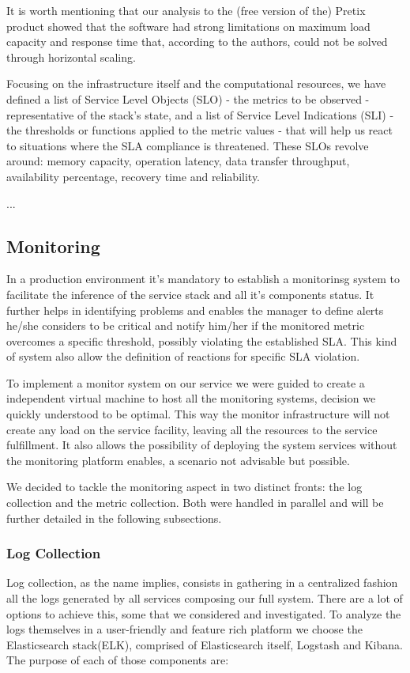 \documentclass[12pt]{article}
\begin{document}
It is worth mentioning that our analysis to the (free version of the) Pretix product showed that the software had strong limitations on maximum load capacity
and response time that, according to the authors, could not be solved through horizontal scaling.

Focusing on the infrastructure itself and the computational resources, we have defined a list of Service Level Objects (SLO) - the metrics to be observed -
representative of the stack's state, and a list of Service Level Indications (SLI) - the thresholds or functions applied to the metric values - that will
help us react to situations where the SLA compliance is threatened.
These SLOs revolve around: memory capacity, operation latency, data transfer throughput, availability percentage, recovery time and reliability.

...

\subsection{Monitoring} \label{management.monitoring} %

In a production environment it's mandatory to establish a monitorinsg system to facilitate the inference of the service stack and all it's components status. It further helps in identifying problems and enables the manager to define alerts he/she considers to be critical and notify him/her if the monitored metric overcomes a specific threshold, possibly violating the established SLA. This kind of system also allow the definition of reactions for specific SLA violation.

To implement a monitor system on our service we were guided to create a independent virtual machine to host all the monitoring systems, decision we quickly understood to be optimal. This way the monitor infrastructure will not create any load on the service facility, leaving all the resources to the service fulfillment. It also allows the possibility of deploying the system services without the monitoring platform enables, a scenario not advisable but possible.

We decided to tackle the monitoring aspect in two distinct fronts: the log collection and the metric collection. Both were handled in parallel and will be further detailed in the following subsections.

\subsubsection{Log Collection}
Log collection, as the name implies, consists in gathering in a centralized fashion all the logs generated by all services composing our full system. There are a lot of options to achieve this, some that we considered and investigated. To analyze the logs themselves in a user-friendly and feature rich platform we choose the Elasticsearch stack(ELK), comprised of Elasticsearch itself, Logstash and Kibana. The purpose of each of those components are:
\end{document}
